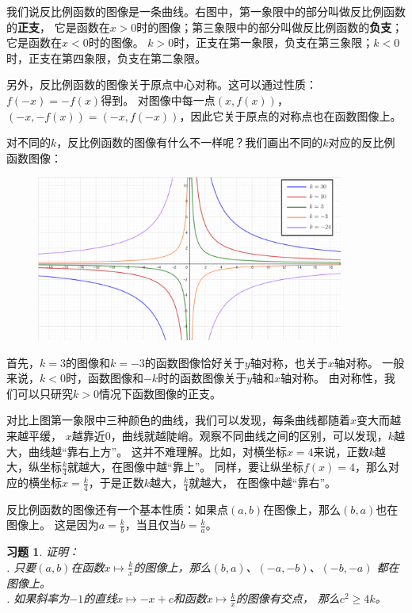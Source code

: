 \documentclass[12pt,UTF8]{ctexbook}
\newtheorem{xt}{习题}[section]
\begin{document}
我们说反比例函数的图像是一条曲线。右图中，第一象限中的部分叫做反比例函数的\textbf{正支}，
它是函数在$x>0$时的图像；第三象限中的部分叫做反比例函数的\textbf{负支}；它是函数在$x<0$时的图像。
$k>0$时，正支在第一象限，负支在第三象限；$k<0$时，正支在第四象限，负支在第二象限。

另外，反比例函数的图像关于原点中心对称。这可以通过性质：$f(-x) = -f(x)$得到。
对图像中每一点$(x, f(x))$，$(-x, -f(x)) = (-x, f(-x))$，因此它关于原点的对称点也在函数图像上。

对不同的$k$，反比例函数的图像有什么不一样呢？我们画出不同的$k$对应的反比例函数图像：

\begin{figure}[h] %
    \centering
    \includegraphics[width=0.9\textwidth]{反比例函数2.png}
\end{figure}

首先，$k=3$的图像和$k=-3$的函数图像恰好关于$y$轴对称，也关于$x$轴对称。
一般来说，$k<0$时，函数图像和$-k$时的函数图像关于$y$轴和$x$轴对称。
由对称性，我们可以只研究$k>0$情况下函数图像的正支。

对比上图第一象限中三种颜色的曲线，我们可以发现，每条曲线都随着$x$变大而越来越平缓，
$x$越靠近$0$，曲线就越陡峭。观察不同曲线之间的区别，可以发现，$k$越大，曲线越“靠右上方”。
这并不难理解。比如，对横坐标$x = 4$来说，正数$k$越大，纵坐标$\frac{k}{4}$就越大，在图像中越“靠上”。
同样，要让纵坐标$f(x) = 4$，那么对应的横坐标$x = \frac{k}{4}$，于是正数$k$越大，$\frac{k}{4}$就越大，
在图像中越“靠右”。

反比例函数的图像还有一个基本性质：如果点$(a, b)$在图像上，那么$(b, a)$也在图像上。
这是因为$a = \frac{k}{b}$，当且仅当$b = \frac{k}{a}$。
\begin{xt}\label{xt:5-0-0}
    证明：\\
    . 只要$(a, b)$在函数$x \mapsto \frac{k}{x}$的图像上，那么$(b, a)$、$(-a, -b)$、$(-b, -a)$
    都在图像上。\\
    . 如果斜率为$-1$的直线$x\mapsto -x + c$和函数$ x \mapsto \frac{k}{x}$的图像有交点，
    那么$c^2 \geqslant 4k$。
\end{xt}
\end{document}

